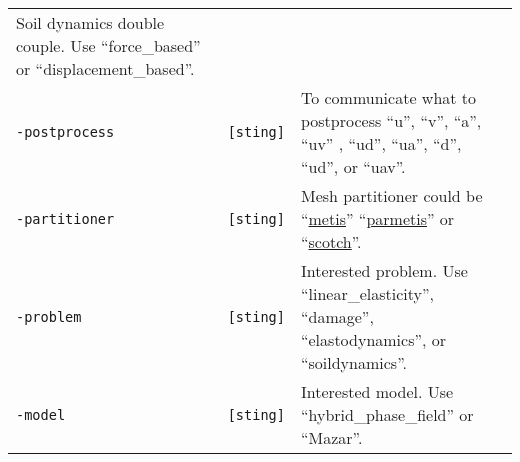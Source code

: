 \begin{longtable}[]{@{}lll@{}}
\begin{minipage}[t]{0.56\columnwidth}
Soil dynamics double couple. Use ``force\_based'' or
``displacement\_based''.\strut
\end{minipage}\tabularnewline
\begin{minipage}[t]{0.26\columnwidth}\raggedright\strut
\lstinline!-postprocess!\strut
\end{minipage} & \begin{minipage}[t]{0.09\columnwidth}\raggedright\strut
\lstinline![sting]!\strut
\end{minipage} & \begin{minipage}[t]{0.56\columnwidth}\raggedright\strut
To communicate what to postprocess ``u'', ``v'', ``a'', ``uv'' , ``ud'',
``ua'', ``d'', ``ud'', or ``uav''.\strut
\end{minipage}\tabularnewline
\begin{minipage}[t]{0.26\columnwidth}\raggedright\strut
\lstinline!-partitioner!\strut
\end{minipage} & \begin{minipage}[t]{0.09\columnwidth}\raggedright\strut
\lstinline![sting]!\strut
\end{minipage} & \begin{minipage}[t]{0.56\columnwidth}\raggedright\strut
Mesh partitioner could be
``\href{http://glaros.dtc.umn.edu/gkhome/metis/metis/overview}{metis}''
``\href{http://glaros.dtc.umn.edu/gkhome/metis/parmetis/overview}{parmetis}''
or ``\href{http://www.labri.fr/perso/pelegrin/scotch/}{scotch}''.\strut
\end{minipage}\tabularnewline
\begin{minipage}[t]{0.26\columnwidth}\raggedright\strut
\lstinline!-problem!\strut
\end{minipage} & \begin{minipage}[t]{0.09\columnwidth}\raggedright\strut
\lstinline![sting]!\strut
\end{minipage} & \begin{minipage}[t]{0.56\columnwidth}\raggedright\strut
Interested problem. Use ``linear\_elasticity'', ``damage'',
``elastodynamics'', or ``soildynamics''.\strut
\end{minipage}\tabularnewline
\begin{minipage}[t]{0.26\columnwidth}\raggedright\strut
\lstinline!-model!\strut
\end{minipage} & \begin{minipage}[t]{0.09\columnwidth}\raggedright\strut
\lstinline![sting]!\strut
\end{minipage} & \begin{minipage}[t]{0.56\columnwidth}\raggedright\strut
Interested model. Use ``hybrid\_phase\_field'' or ``Mazar''.\strut
\end{minipage}\tabularnewline
\bottomrule
\end{longtable}

